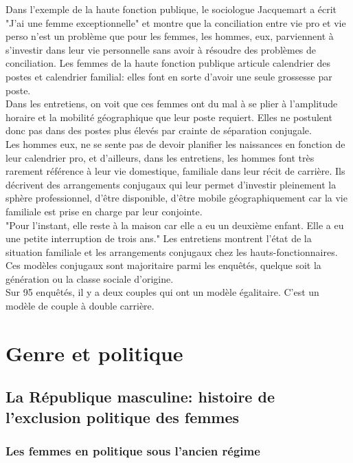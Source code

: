 \documentclass[10pt, a4paper, openany]{book}
\begin{document}
Dans l'exemple de la haute fonction publique, le sociologue Jacquemart a écrit "J'ai une femme exceptionnelle" et montre que la conciliation entre vie pro et vie perso n'est un problème que pour les femmes, les hommes, eux, parviennent à s'investir dans leur vie personnelle sans avoir à résoudre des problèmes de conciliation. Les femmes de la haute fonction publique articule calendrier des postes et calendrier familial: elles font en sorte d'avoir une seule grossesse par poste. \\
Dans les entretiens, on voit que ces femmes ont du mal à se plier à l'amplitude horaire et la mobilité géographique que leur poste requiert. Elles ne postulent donc pas dans des postes plus élevés par crainte de séparation conjugale. \\
Les hommes eux, ne se sente pas de devoir planifier les naissances en fonction de leur calendrier pro, et d'ailleurs, dans les entretiens, les hommes font très rarement référence à leur vie domestique, familiale dans leur récit de carrière. Ils décrivent des arrangements conjugaux qui leur permet d'investir pleinement la sphère professionnel, d'être disponible, d'être mobile géographiquement car la vie familiale est prise en charge par leur conjointe. \\
"Pour l'instant, elle reste à la maison car elle a eu un deuxième enfant. Elle a eu une petite interruption de trois ans." Les entretiens montrent l'état de la situation familiale et les arrangements conjugaux chez les hauts-fonctionnaires. Ces modèles conjugaux sont majoritaire parmi les enquêtés, quelque soit la génération ou la classe sociale d'origine. \\
Sur 95 enquêtés, il y a deux couples qui ont un modèle égalitaire. C'est un modèle de couple à double carrière. 


\chapter{Genre et politique}

\section{La République masculine: histoire de l'exclusion politique des femmes}

\subsection{Les femmes en politique sous l'ancien régime}
\end{document}
